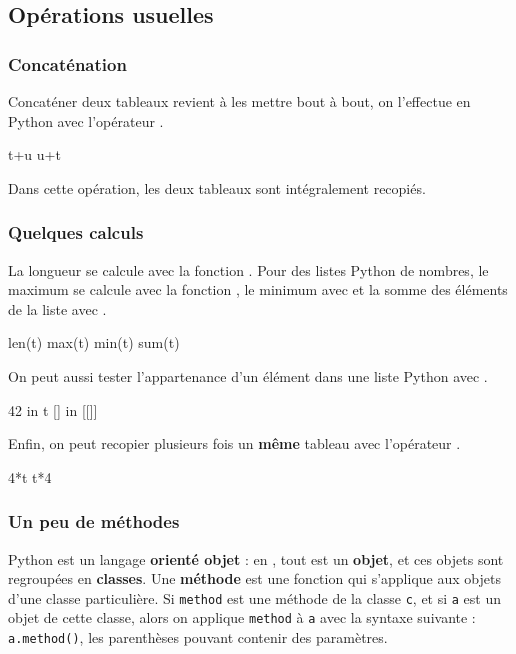\subsection{Opérations usuelles}

\subsubsection{Concaténation}
Concaténer deux tableaux revient à les mettre bout à bout, on l'effectue en Python avec 
l'opérateur \pyv{+}.
\begin{pyconsole}
t+u
u+t
\end{pyconsole}
Dans cette opération, les deux tableaux sont intégralement recopiés. 

\subsubsection{Quelques calculs}
La longueur se calcule avec la fonction . Pour des listes Python de nombres, le maximum 
se calcule avec la fonction , le minimum avec  et la somme des éléments de la 
liste avec .
\begin{pyconsole}
len(t)
max(t)
min(t)
sum(t)
\end{pyconsole}

On peut aussi tester l'appartenance d'un élément dans une liste Python avec .

\begin{pyconsole}
42 in t
[] in [[]]
\end{pyconsole}

Enfin, on peut recopier plusieurs fois un \textbf{même} tableau avec l'opérateur \pyv{*}.

\begin{pyconsole}
4*t
t*4
\end{pyconsole}




\subsubsection{Un peu de méthodes}
Python est un langage \textbf{orienté objet} : en \python, tout est un \textbf{objet}, et ces objets 
sont regroupées en \textbf{classes}. Une \textbf{méthode} est une fonction qui s'applique aux objets 
d'une classe particulière. Si \texttt{method} est une méthode de la classe \texttt{c}, et si 
\texttt{a} est un objet de cette classe, alors on applique \texttt{method} à \texttt{a} avec la 
syntaxe suivante : \texttt{a.method()}, les parenthèses pouvant contenir des paramètres.\\

